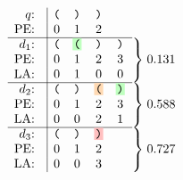 \documentclass{article}
\newcommand{\hlbox}[2]{%
  \begingroup
  \setlength{\fboxsep}{1pt}%
  \ensuremath{\text{\colorbox{#1}{#2}}}%
  \endgroup
}
\newcommand{\hlorange}[1]{\hlbox{orange!30}{#1}}
\newcommand{\hlgreen}[1]{\hlbox{green!25}{#1}}
\newcommand{\hlred}[1]{\hlbox{red!25}{#1}}
\begin{document}
\ensuremath{
  \begin{array}{r@{\hskip 0.5em}c|cccc@{\hskip 0.6em}l}
    \text{$q$:}   & & \texttt{(} & \texttt{)} & \texttt{)} & & \\
    \text{PE:}    & & 0 & 1 & 2 & & \\\cline{1-6}
    \text{$d_1$:} & & \texttt{(} & \hlgreen{\texttt{(}} & \texttt{)} & \texttt{)} & \rdelim\}{3}{*}[\;0.131] \\
    \text{PE:}    & & 0 & 1 & 2 & 3 & \\
    \text{LA:}    & & 0 & 1 & 0 & 0 & \\\cline{1-6}
    \text{$d_2$:} & & \texttt{(} & \texttt{)} & \hlorange{\texttt{(}} & \hlgreen{\texttt{)}} & \rdelim\}{3}{*}[\;0.588] \\
    \text{PE:}    & & 0 & 1 & 2 & 3 & \\
    \text{LA:}    & & 0 & 0 & 2 & 1 & \\\cline{1-6}
    \text{$d_3$:} & & \texttt{(} & \texttt{)} & \hlred{\texttt{)}} & & \rdelim\}{3}{*}[\;0.727] \\
    \text{PE:}    & & 0 & 1 & 2 & & \\
    \text{LA:}    & & 0 & 0 & 3 & &
  \end{array}
}
\end{document}
